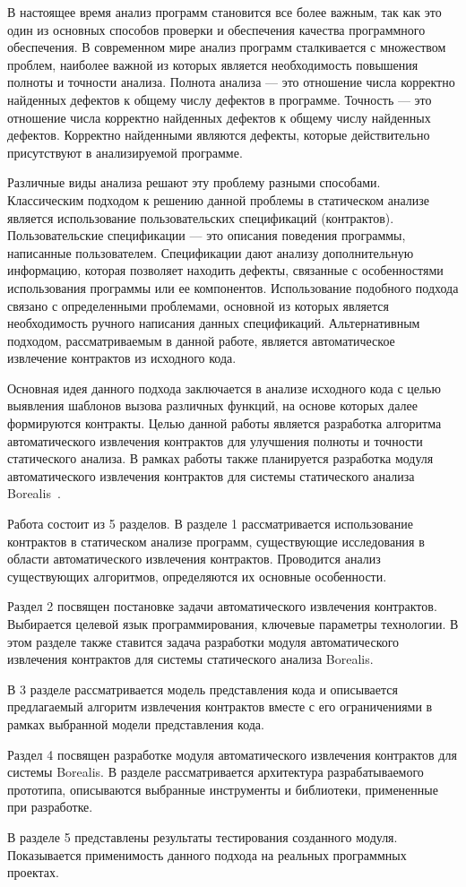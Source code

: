 \intro
В настоящее время анализ программ становится все более важным, так как это один из основных способов проверки и обеспечения качества программного обеспечения. В современном мире анализ программ сталкивается с множеством проблем, наиболее важной из которых является необходимость повышения полноты и точности анализа. Полнота анализа --- это отношение числа корректно найденных дефектов к общему числу дефектов в программе. Точность --- это отношение числа корректно найденных дефектов к общему числу найденных дефектов. Корректно найденными являются дефекты, которые действительно присутствуют в анализируемой программе.

Различные виды анализа решают эту проблему разными способами. Классическим подходом к решению данной проблемы в статическом анализе является использование пользовательских спецификаций (контрактов). Пользовательские спецификации --- это описания поведения программы, написанные пользователем. Спецификации дают анализу дополнительную информацию, которая позволяет находить дефекты, связанные с особенностями использования программы или ее компонентов. Использование подобного подхода связано с определенными проблемами, основной из которых является необходимость ручного написания данных спецификаций. Альтернативным подходом, рассматриваемым в данной работе, является автоматическое извлечение контрактов из исходного кода.

Основная идея данного подхода заключается в анализе исходного кода с целью выявления шаблонов вызова различных функций, на основе которых далее формируются контракты. Целью данной работы является разработка алгоритма автоматического извлечения контрактов для улучшения полноты и точности статического анализа. В рамках работы также планируется разработка модуля автоматического извлечения контрактов для системы статического анализа Borealis~\cite{borealis}.

Работа состоит из 5 разделов. В разделе 1 рассматривается использование контрактов в статическом анализе программ, существующие исследования в области автоматического извлечения контрактов. Проводится анализ существующих алгоритмов, определяются их основные особенности.

Раздел 2 посвящен постановке задачи автоматического извлечения контрактов. Выбирается целевой язык программирования, ключевые параметры технологии. В этом разделе также ставится задача разработки модуля автоматического извлечения контрактов для системы статического анализа Borealis.

В 3 разделе рассматривается модель представления кода и описывается предлагаемый алгоритм извлечения контрактов вместе с его ограничениями в рамках выбранной модели представления кода.

Раздел 4 посвящен разработке модуля автоматического извлечения контрактов для системы Borealis. В разделе рассматривается архитектура разрабатываемого прототипа, описываются выбранные инструменты и библиотеки, примененные при разработке.

В разделе 5 представлены результаты тестирования созданного модуля. Показывается применимость данного подхода на реальных программных проектах.
